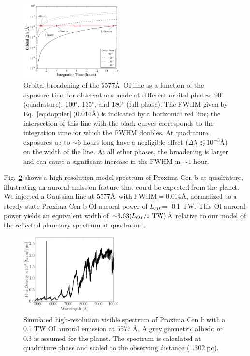 \documentclass{emulateapj}
\newcommand{\XXX}[1]{#1}      %
\newcommand{\xxx}[1]{{\color{red} #1}} %
\begin{document}
\begin{figure}[bt]
\includegraphics[width=0.47\textwidth]{orbital_broadening.pdf}
\caption{Orbital broadening of the 5577\AA\ OI line as a function of the exposure time for observations made at different orbital phases: 90$^\circ$ (quadrature), 100$^\circ$, 135$^\circ$, and 180$^\circ$ (full phase). The FWHM given by Eq.~\ref{eq:doppler} \XXX{(0.014\AA)} is indicated by a horizontal red line; the intersection of this line with the black curves corresponds to the integration time for which the FWHM doubles. At quadrature, exposures up to ${\sim} 6$ hours long have a negligible effect ($\Delta\lambda \lesssim 10^{-3}$\AA) on the width of the line. At all other phases, the broadening is larger and can cause a significant increase in the FWHM in ${\sim} 1$ hour.\\[0in]}
\label{fig:orbital_broadening}
\end{figure}

Fig.~\ref{fig:spec} shows a high-resolution model spectrum of Proxima Cen b at quadrature, illustrating an auroral emission feature that could be expected from the planet. We injected a Gaussian line at 5577\AA\ with $\text{FWHM} = 0.014$\AA, normalized to a steady-state Proxima Cen b OI auroral power of $L_{OI} = $ \XXX{0.1 TW}. This OI auroral power yields an equivalent width of ${\sim} 3.63 (L_{OI}/1 {\rm \ TW})$\AA\ relative to our model of the reflected planetary spectrum at quadrature.

\begin{figure}[bt]
\includegraphics[width=0.47\textwidth]{OI_ref_spec.pdf}
\caption{Simulated high-resolution visible spectrum of Proxima Cen b with a \XXX{0.1 TW} OI auroral emission at $5577$ \AA. A grey geometric albedo of 0.3 is assumed for the planet. The spectrum is calculated at quadrature phase and scaled to the observing distance (1.302 pc).} %
\label{fig:spec}
\end{figure}
\end{document}
